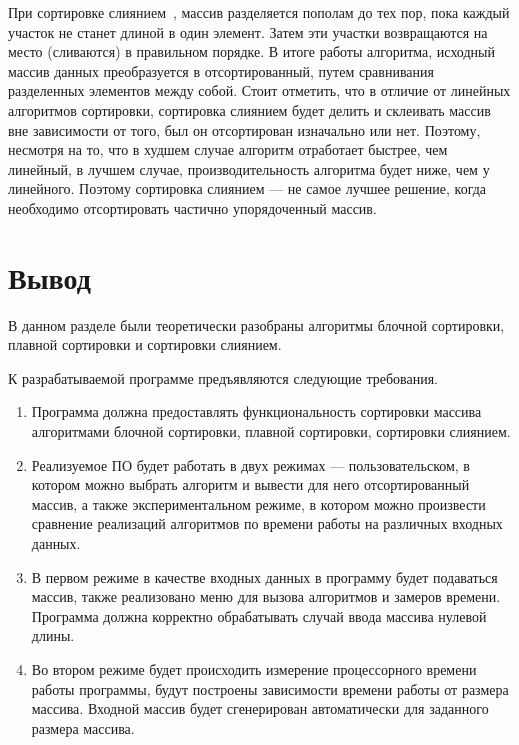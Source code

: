 При сортировке слиянием~\cite{merge-sort}, массив разделяется пополам до тех пор, пока каждый участок не станет длиной в один элемент. Затем эти участки возвращаются на место (сливаются) в правильном порядке. В итоге работы алгоритма, исходный массив данных преобразуется в отсортированный, путем сравнивания разделенных элементов между собой. Стоит отметить, что в отличие от линейных алгоритмов сортировки, сортировка слиянием будет делить и склеивать массив вне зависимости от того, был он отсортирован изначально или нет. Поэтому, несмотря на то, что в худшем случае алгоритм отработает быстрее, чем линейный, в лучшем случае, производительность алгоритма будет ниже, чем у линейного. Поэтому сортировка слиянием --- не самое лучшее решение, когда необходимо отсортировать частично упорядоченный массив.

\section{Вывод}

В данном разделе были теоретически разобраны алгоритмы блочной сортировки, плавной сортировки и сортировки слиянием.

К разрабатываемой программе предъявляются следующие требования.

\begin{enumerate}
	\item Программа должна предоставлять функциональность сортировки массива алгоритмами блочной сортировки, плавной сортировки, сортировки слиянием.
	
	\item Реализуемое ПО будет работать в двух режимах --- пользовательском, в котором можно выбрать алгоритм и вывести для него отсортированный массив, а также экспериментальном режиме, в котором можно произвести сравнение реализаций алгоритмов по времени работы на различных входных данных.
	
	\item В первом режиме в качестве входных данных в программу будет подаваться массив, также реализовано меню для вызова алгоритмов и замеров времени. Программа должна корректно обрабатывать случай ввода массива нулевой длины.
	
	\item Во втором режиме будет происходить измерение процессорного времени работы программы, будут построены зависимости времени работы от размера массива. Входной массив будет сгенерирован автоматически для заданного размера массива.
\end{enumerate}